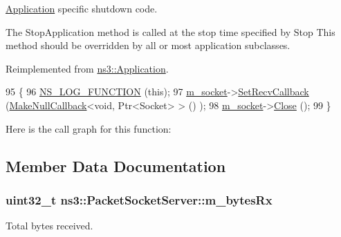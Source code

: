 \hyperlink{classns3_1_1Application}{Application} specific shutdown code. 

The Stop\+Application method is called at the stop time specified by Stop This method should be overridden by all or most application subclasses. 

Reimplemented from \hyperlink{classns3_1_1Application_aea844f3c114b1faf8de1faf5127ea8b4}{ns3\+::\+Application}.


\begin{DoxyCode}
95 \{
96   \hyperlink{log-macros-disabled_8h_a90b90d5bad1f39cb1b64923ea94c0761}{NS\_LOG\_FUNCTION} (\textcolor{keyword}{this});
97   \hyperlink{classns3_1_1PacketSocketServer_a3a15d1cb5dfa1472a94ab958427c3f3e}{m\_socket}->\hyperlink{classns3_1_1Socket_a243f7835ef1a85f9270fd3577e3a40da}{SetRecvCallback} (\hyperlink{group__makenullcallback_ga7e3cd6816f63ea9112c04b0086c2c65a}{MakeNullCallback}<\textcolor{keywordtype}{void}, Ptr<Socket> > ()
      );
98   \hyperlink{classns3_1_1PacketSocketServer_a3a15d1cb5dfa1472a94ab958427c3f3e}{m\_socket}->\hyperlink{classns3_1_1Socket_abdac6e2498c5aa2963ef361d4200ddf3}{Close} ();
99 \}
\end{DoxyCode}


Here is the call graph for this function\+:




\subsection{Member Data Documentation}
\subsubsection[{\texorpdfstring{m\+\_\+bytes\+Rx}{m_bytesRx}}]{\setlength{\rightskip}{0pt plus 5cm}uint32\+\_\+t ns3\+::\+Packet\+Socket\+Server\+::m\+\_\+bytes\+Rx\hspace{0.3cm}{\ttfamily [private]}}\hypertarget{classns3_1_1PacketSocketServer_a007a317437b5be01ee349ec3c3333425}{}\label{classns3_1_1PacketSocketServer_a007a317437b5be01ee349ec3c3333425}


Total bytes received. 

